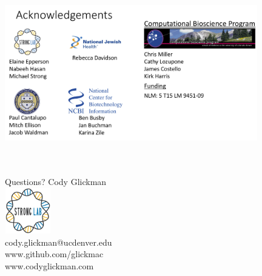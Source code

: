 \documentclass[11pt]{beamer}
\begin{document}
	
	
	
	\begin{frame}{}
	\vspace{1cm}
	{\includegraphics[height=8cm, width=11cm]{Acknowledgements.png} }
	\end{frame}
	
	
	\begin{frame}{Questions?}
	\center
	Cody Glickman \\ \includegraphics[height=2cm, width=2cm]{lablogo.png} \\ cody.glickman@ucdenver.edu \\ \alert{www.github.com/glickmac} \\ www.codyglickman.com
	\end{frame}
	
\end{document}
